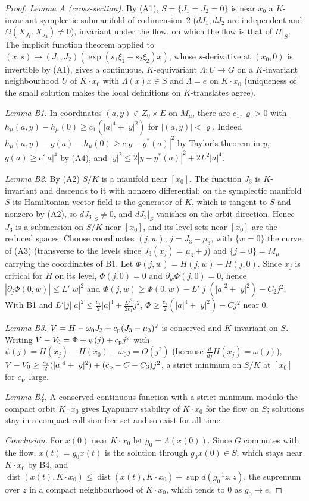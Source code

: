 \documentclass[11pt]{article}
\numberwithin{equation}{section}
\theoremstyle{definition}
\theoremstyle{remark}
\begin{document}
\begin{proof}
\emph{Lemma A (cross-section).} By (A1), $S=\{J_1=J_2=0\}$ is near $x_0$ a $K$-invariant symplectic
submanifold of codimension~$2$ ($dJ_1,dJ_2$ are independent and $\Omega(X_{J_1},X_{J_2})\ne0$), invariant
under the flow, on which the flow is that of $H|_S$. The implicit function theorem applied to
$(x,s)\mapsto(J_1,J_2)(\exp(s_1\xi_1+s_2\xi_2)x)$, whose $s$-derivative at $(x_0,0)$ is invertible by (A1),
gives a continuous, $K$-equivariant $\Lambda:U\to G$ on a $K$-invariant neighbourhood $U$ of $K\cdot x_0$
with $\Lambda(x)x\in S$ and $\Lambda=e$ on $K\cdot x_0$ (uniqueness of the small solution makes the local
definitions on $K$-translates agree).

\emph{Lemma B1.} In coordinates $(a,y)\in Z_0\times E$ on $M_\mu$, there are $c_1,\varrho>0$ with
$h_\mu(a,y)-h_\mu(0)\ge c_1(|a|^4+|y|^2)$ for $|(a,y)|<\varrho$. Indeed
$h_\mu(a,y)-g(a)-h_\mu(0)\ge c|y-y^*(a)|^2$ by Taylor's theorem in $y$, $g(a)\ge c'|a|^4$ by (A4), and
$|y|^2\le2|y-y^*(a)|^2+2L^2|a|^4$.

\emph{Lemma B2.} By (A2) $S/K$ is a manifold near $[x_0]$. The function $J_3$ is $K$-invariant and descends
to it with nonzero differential: on the symplectic manifold $S$ its Hamiltonian vector field is the
generator of $K$, which is tangent to $S$ and nonzero by (A2), so $dJ_3|_S\ne0$, and $dJ_3|_S$ vanishes on the
orbit direction. Hence $J_3$ is a submersion on $S/K$ near $[x_0]$, and its level sets near $[x_0]$ are the
reduced spaces. Choose coordinates $(j,w)$, $j=J_3-\mu_3$, with $\{w=0\}$ the
curve of (A3) (transverse to the levels since $J_3(x_j)=\mu_3+j$) and $\{j=0\}=M_\mu$ carrying the coordinates of B1. Let $\Phi(j,w)=H(j,w)-H(j,0)$. Since
$x_j$ is critical for $H$ on its level, $\Phi(j,0)=0$ and $\partial_w\Phi(j,0)=0$, hence
$|\partial_j\Phi(0,w)|\le L'|w|^2$ and
$\Phi(j,w)\ge\Phi(0,w)-L'|j|(|a|^2+|y|^2)-C_2j^2$. With B1 and $L'|j||a|^2\le\frac{c_1}2|a|^4+\frac{L'^2}{2c_1}j^2$,
$\Phi\ge\frac{c_1}2(|a|^4+|y|^2)-Cj^2$ near $0$.

\emph{Lemma B3.} $V=H-\omega_0J_3+c_{\rm p}(J_3-\mu_3)^2$ is conserved and $K$-invariant on $S$. Writing
$V-V_0=\Phi+\psi(j)+c_{\rm p}j^2$ with $\psi(j)=H(x_j)-H(x_0)-\omega_0j=O(j^2)$ (because $\frac d{dj}H(x_j)=\omega(j)$),
$V-V_0\ge\frac{c_1}2(|a|^4+|y|^2)+(c_{\rm p}-C-C_3)j^2$, a strict minimum on $S/K$ at $[x_0]$ for $c_{\rm p}$ large.

\emph{Lemma B4.} A conserved continuous function with a strict minimum modulo the compact orbit
$K\cdot x_0$ gives Lyapunov stability of $K\cdot x_0$ for the flow on $S$; solutions stay in a compact
collision-free set and so exist for all time.

\emph{Conclusion.} For $x(0)$ near $K\cdot x_0$ let $g_0=\Lambda(x(0))$. Since $G$ commutes with the flow,
$\tilde x(t)=g_0x(t)$ is the solution through $g_0x(0)\in S$, which stays near $K\cdot x_0$ by B4, and
$\operatorname{dist}(x(t),K\cdot x_0)\le\operatorname{dist}(\tilde x(t),K\cdot x_0)+\sup d(g_0^{-1}z,z)$, the
supremum over $z$ in a compact neighbourhood of $K\cdot x_0$, which tends to $0$ as $g_0\to e$.
\end{proof}
\end{document}
